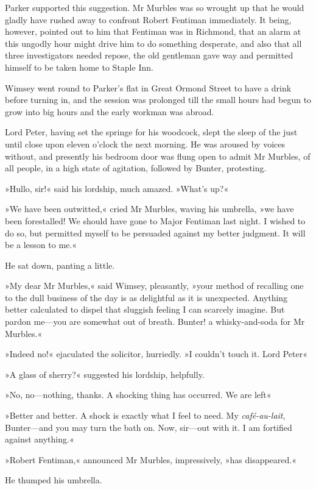 Parker supported this suggestion. Mr Murbles was so wrought up that he would gladly have rushed away to confront Robert Fentiman immediately. It being, however, pointed out to him that Fentiman was in Richmond, that an alarm at this ungodly hour might drive him to do something desperate, and also that all three investigators needed repose, the old gentleman gave way and permitted himself to be taken home to Staple Inn.

Wimsey went round to Parker's flat in Great Ormond Street to have a drink before turning in, and the session was prolonged till the small hours had begun to grow into big hours and the early workman was abroad.

Lord Peter, having set the springe for his woodcock, slept the sleep of the just until close upon eleven o'clock the next morning. He was aroused by voices without, and presently his bedroom door was flung open to admit Mr Murbles, of all people, in a high state of agitation, followed by Bunter, protesting.

»Hullo, sir!« said his lordship, much amazed. »What's up?«

»We have been outwitted,« cried Mr Murbles, waving his umbrella, »we have been forestalled! We should have gone to Major Fentiman last night. I wished to do so, but permitted myself to be persuaded against my better judgment. It will be a lesson to me.«

He sat down, panting a little.

»My dear Mr Murbles,« said Wimsey, pleasantly, »your method of recalling one to the dull business of the day is as delightful as it is unexpected. Anything better calculated to dispel that sluggish feeling I can scarcely imagine. But pardon me—you are somewhat out of breath. Bunter! a whisky-and-soda for Mr Murbles.«

»Indeed no!« ejaculated the solicitor, hurriedly. »I couldn't touch it. Lord Peter\longdash«

»A glass of sherry?« suggested his lordship, helpfully.

»No, no—nothing, thanks. A shocking thing has occurred. We are left\longdash«

»Better and better. A shock is exactly what I feel to need. My \textit{café-au-lait}, Bunter—and you may turn the bath on. Now, sir—out with it. I am fortified against anything.«

»Robert Fentiman,« announced Mr Murbles, impressively, »has disappeared.«

He thumped his umbrella.

